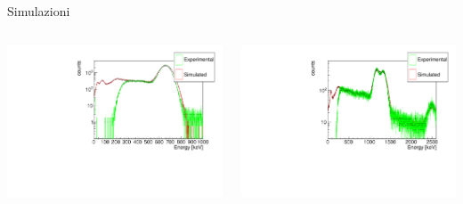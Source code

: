 \documentclass [xcolor=svgnames, 9pt] {beamer}
\begin{document}
\begin{frame}{Simulazioni}%
	\begin{columns}
		\begin{column}{0.5\textwidth}
			\centering
			\includegraphics[width=\textwidth]{img/Caesium_scaled.pdf}
			
		\end{column}
	\begin{column}{0.5\textwidth}
		\centering
			\includegraphics[width=\textwidth]{img/Cobalt_scaled.pdf}
	\end{column}%
	\end{columns}
\begin{table}[h]
		\centering
		

\end{table}
\end{frame}
\end{document}
